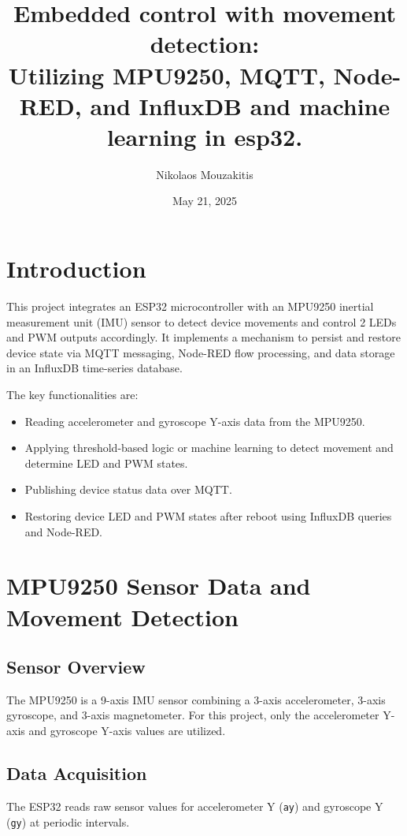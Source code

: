 \documentclass[a4paper,12pt]{article}
\title{Embedded control with movement detection: \\ Utilizing MPU9250, MQTT, Node-RED, and InfluxDB and machine learning in esp32.}
\author{Nikolaos Mouzakitis}
\date{May 21, 2025}
\begin{document}
\maketitle

\section{Introduction}

This project integrates an ESP32 microcontroller with an MPU9250 
inertial measurement unit (IMU) sensor to detect device movements 
and control 2 LEDs and PWM outputs accordingly. 
It implements a mechanism to persist and restore device state 
via MQTT messaging, Node-RED flow processing, and data storage in an InfluxDB time-series database.

The key 
functionalities are:

\begin{itemize}
    \item Reading accelerometer and gyroscope Y-axis data from the MPU9250.
    \item Applying threshold-based logic or machine learning to detect movement and determine LED and PWM states.
    \item Publishing device status data over MQTT.
    \item Restoring device LED and PWM states after reboot using InfluxDB queries and Node-RED.
\end{itemize}

\section{MPU9250 Sensor Data and Movement Detection}

\subsection{Sensor Overview}

The MPU9250 is a 9-axis IMU sensor combining a 3-axis accelerometer, 
3-axis gyroscope, and 3-axis magnetometer. 
For this project, only the accelerometer Y-axis and gyroscope Y-axis values 
are utilized.

\subsection{Data Acquisition}

The ESP32 reads raw sensor values for accelerometer Y (\texttt{ay}) 
and gyroscope Y (\texttt{gy}) at periodic intervals.
\end{document}
